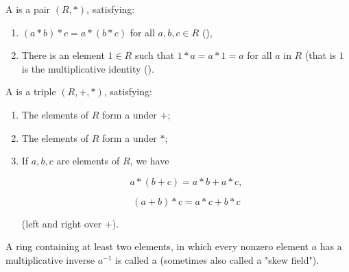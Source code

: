 \begin{definition}[Monoid]
    \label{Monoid}
    \leanok

    A  is a pair $(R, *)$, satisfying:

    \begin{enumerate}
    \item $(a * b) * c = a * (b * c)$ for all $a, b, c \in R$ (),

    \item There is an element $1 \in R$ such that $1 * a = a * 1 = a$ for all $a$ in $R$
    (that is $1$ is the multiplicative identity ().

    \end{enumerate}

\end{definition}

\begin{definition}[Ring]
    \label{Ring}
    \leanok

    A  is a triple $(R, +, *)$, satisfying:

    \begin{enumerate}
    \item The elements of $R$ form a  under $+$;

    \item The elements of $R$ form a  under $*$;

    \item If $a, b, c$ are elements of $R$, we have

    $$
    a * (b + c) = a * b + a * c,
    $$

    $$
    (a + b) * c = a * c + b * c
    $$

    (left and right  over $+$).

    \end{enumerate}

\end{definition}

\begin{definition}
    \label{DivisionRing}
    \leanok

    A ring containing at least two elements, in which
    every nonzero element $a$ has a multiplicative inverse $a^{-1}$ is called a  
    (sometimes also called a "skew field").

\end{definition}

